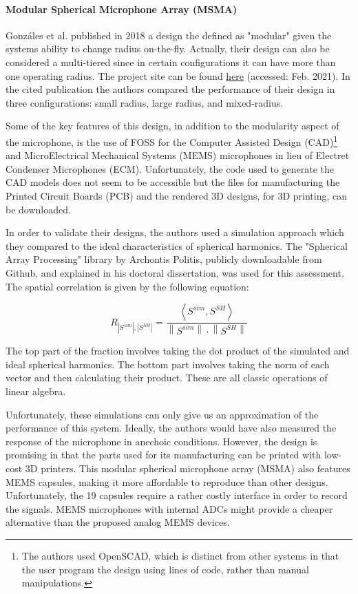 \paragraph{Modular Spherical Microphone Array (MSMA)}

Gonzáles et al. \cite{gonzalez2018modular} published in 2018 a design the defined as "modular" given the systems ability to change radius on-the-fly. Actually, their design can also be considered a multi-tiered since in certain configurations it can have more than one operating radius. The project site can be found \href{https://www.appropedia.org/Modular_Spherical_Microphone_Array}{here} (accessed: Feb. 2021). In the cited publication the authors compared the performance of their design in three configurations: small radius, large radius, and mixed-radius. 

Some of the key features of this design, in addition to the modularity aspect of the microphone, is the use of FOSS for the Computer Assisted Design (CAD)\footnote{The authors used OpenSCAD, which is distinct from other systems in that the user program the design using lines of code, rather than manual manipulations.} and MicroElectrical Mechanical Systems (MEMS) microphones in lieu of Electret Condenser Microphones (ECM). Unfortunately, the code used to generate the CAD models does not seem to be accessible but the files for manufacturing the Printed Circuit Boards (PCB) and the rendered 3D designs, for 3D printing, can be downloaded. 

In order to validate their designs, the authors used a simulation approach which they compared to the ideal characteristics of spherical harmonics. The "Spherical Array Processing" library by Archontis Politis, publicly downloadable from Github, and explained in his doctoral dissertation, was used for this assessment. The spatial correlation is given by the following equation: 

\begin{equation}
R_{\left|S^{s i m}\right|,\left|S^{S H}\right|}=\frac{\left\langle S^{s i m}, S^{S H}\right\rangle}{\left\|S^{s i m}\right\| \cdot\left\|S^{S H}\right\|}
\end{equation}

The top part of the fraction involves taking the dot product of the simulated and ideal spherical harmonics. The bottom part involves taking the norm of each vector and then calculating their product. These are all classic operations of linear algebra. 

Unfortunately, these simulations can only give us an approximation of the performance of this system. Ideally, the authors would have also measured the response of the microphone in anechoic conditions. However, the design is promising in that the parts used for its manufacturing can be printed with low-cost 3D printers. This modular spherical microphone array (MSMA) also features MEMS capsules, making it more affordable to reproduce than other designs. Unfortunately, the 19 capsules require a rather costly interface in order to record the signals. MEMS microphones with internal ADCs might provide a cheaper alternative than the proposed analog MEMS devices. 

